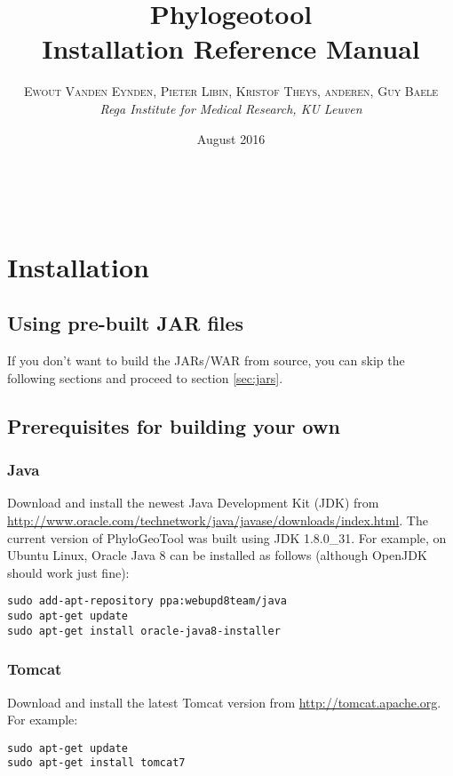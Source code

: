 \documentclass[a4paper, 11pt]{article} %
\title{\textbf{Phylogeotool}\\ %
Installation Reference Manual} %
\author{\textsc{Ewout Vanden Eynden, Pieter Libin, Kristof Theys, anderen, Guy Baele} %
\\{\textit{Rega Institute for Medical Research, KU Leuven}}} %
\date{August 2016} %
\makeatletter
\renewcommand{\maketitle}{ %
\begin{flushright} %
{\LARGE\@title} %

\vspace{50pt} %

{\large\@author} %
\\\@date %

\vspace{40pt} %
\end{flushright}
}
\makeatother
\begin{document}
\maketitle %

\vspace{30pt} %

\tableofcontents
\newpage

\section{Installation}

\subsection{Using pre-built JAR files}
If you don't want to build the JARs/WAR from source, you can skip the following sections and proceed to section \ref{sec:jars}.


\subsection{Prerequisites for building your own}

\subsubsection*{Java}
Download and install the newest Java Development Kit (JDK) from \url{http://www.oracle.com/technetwork/java/javase/downloads/index.html}.
The current version of PhyloGeoTool was built using JDK 1.8.0\_31.
For example, on Ubuntu Linux, Oracle Java 8 can be installed as follows (although OpenJDK should work just fine):
\begin{verbatim} 
sudo add-apt-repository ppa:webupd8team/java
sudo apt-get update
sudo apt-get install oracle-java8-installer
\end{verbatim}

\subsubsection*{Tomcat}
Download and install the latest Tomcat version from \url{http://tomcat.apache.org}.
For example:
\begin{verbatim}
sudo apt-get update
sudo apt-get install tomcat7
\end{verbatim}
\end{document}
